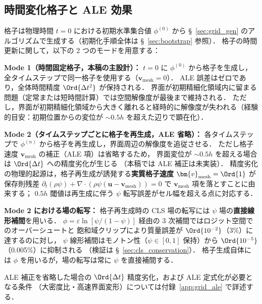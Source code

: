 \subsection{時間変化格子と ALE 効果}
\label{sec:grid_ale}

格子は物理時間 $t=0$ における初期水準集合値 $\phi^{(0)}$ から
§~\ref{sec:grid_gen} のアルゴリズムで生成する（初期化手順全体は §~\ref{sec:bootstrap} 参照）．
格子の時間更新に関して，以下の 2 つのモードを用意する：

\begin{tcolorbox}[mybox, title={格子使用モードの選択}]
\label{box:grid_modes}
\textbf{Mode 1（時間固定格子，本稿の主設計）：}
$t=0$ に $\phi^{(0)}$ から格子を生成し，全タイムステップで同一格子を使用する（$\bm{v}_\text{mesh}=0$）．
ALE 誤差はゼロであり，全体時間精度 $\Ord{\Delta t^2}$ が保持される．
界面が初期精細化領域内に留まる問題（定常または短時間計算）では空間解像度が最後まで維持される．
ただし，界面が初期精細化領域から大きく離れると経時的に解像度が失われる（経験的目安：初期位置からの変位が ${\sim}0.5h$ を超えた辺りで顕在化）．

\textbf{Mode 2（タイムステップごとに格子を再生成，ALE 省略）：}
各タイムステップで $\phi^{(n)}$ から格子を再生成し，界面周辺の解像度を追従させる．
ただし格子速度 $\bm{v}_\text{mesh}$ の補正（ALE 項）は省略するため，
界面変位が ${\sim}0.5h$ を超える場合は $\Ord{\Delta t}$ への精度劣化が生じる
（本稿では ALE 補正は未実装）．
精度劣化の物理的起源は，格子再生成が誘発する\textbf{実質格子速度} $\bm{v}_\text{mesh}=\Ord{1}$ が
保存則残差 $\partial_t(\rho\psi) + \nabla\cdot(\rho\psi(\bm{u}-\bm{v}_\text{mesh}))=0$ で
$\bm{v}_\text{mesh}$ 項を落とすことに由来する；
$0.5h$ 閾値は再生成に伴う $\psi$ 転写誤差がセル幅を超える点に対応する．

\textbf{Mode 2 における場の転写：}
格子再生成時の CLS 場の転写には $\psi$ 場の\textbf{直接線形補間}を用いる．
$\phi = \varepsilon\ln[\psi/(1-\psi)]$ 経由の 3 次補間ではロジット空間でのオーバーシュートと
飽和域クリップにより質量誤差が $\Ord{10^{-2}}$（3\%）に達するのに対し，
$\psi$ 線形補間はモノトン性（$\psi \in [0,1]$ 保持）から $\Ord{10^{-5}}$（0.005\%）に抑制される
（検証は §~\ref{sec:cls_conservation}）．
格子生成自体には $\phi$ を用いるが，場の転写は常に $\psi$ を直接補間する．
\end{tcolorbox}

ALE 補正を省略した場合の $\Ord{\Delta t}$ 精度劣化，および ALE 定式化が必要となる条件
（大密度比・高速界面変形）については付録~\ref{app:grid_ale} で詳述する．

